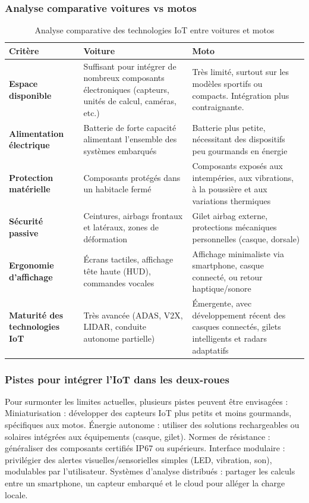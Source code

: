 \subsubsection{Analyse comparative voitures vs motos}
\begin{table}[H]
\centering
\caption{Analyse comparative des technologies IoT entre voitures et motos}
\begin{tabular}{|p{4.5cm}|p{5.5cm}|p{5.5cm}|}
\hline
\textbf{Critère} & \textbf{Voiture} & \textbf{Moto} \\
\hline
\textbf{Espace disponible} & Suffisant pour intégrer de nombreux composants électroniques (capteurs, unités de calcul, caméras, etc.) & Très limité, surtout sur les modèles sportifs ou compacts. Intégration plus contraignante. \\
\hline
\textbf{Alimentation électrique} & Batterie de forte capacité alimentant l’ensemble des systèmes embarqués & Batterie plus petite, nécessitant des dispositifs peu gourmands en énergie \\
\hline
\textbf{Protection matérielle} & Composants protégés dans un habitacle fermé & Composants exposés aux intempéries, aux vibrations, à la poussière et aux variations thermiques \\
\hline
\textbf{Sécurité passive} & Ceintures, airbags frontaux et latéraux, zones de déformation & Gilet airbag externe, protections mécaniques personnelles (casque, dorsale) \\
\hline
\textbf{Ergonomie d'affichage} & Écrans tactiles, affichage tête haute (HUD), commandes vocales & Affichage minimaliste via smartphone, casque connecté, ou retour haptique/sonore \\
\hline
\textbf{Maturité des technologies IoT} & Très avancée (ADAS, V2X, LIDAR, conduite autonome partielle) & Émergente, avec développement récent des casques connectés, gilets intelligents et radars adaptatifs \\
\hline
\end{tabular}
\label{tab:comparaison_iot_voiture_moto}
\end{table}

\subsubsection{Pistes pour intégrer l’IoT dans les deux-roues}
Pour surmonter les limites actuelles, plusieurs pistes peuvent être envisagées :
Miniaturisation : développer des capteurs IoT plus petits et moins gourmands, spécifiques aux motos.
Énergie autonome : utiliser des solutions rechargeables ou solaires intégrées aux équipements (casque, gilet).
Normes de résistance : généraliser des composants certifiés IP67 ou supérieurs.
Interface modulaire : privilégier des alertes visuelles/sensorielles simples (LED, vibration, son), modulables par l’utilisateur.
Systèmes d’analyse distribués : partager les calculs entre un smartphone, un capteur embarqué et le cloud pour alléger la charge locale.
\vspace{0.5cm}

